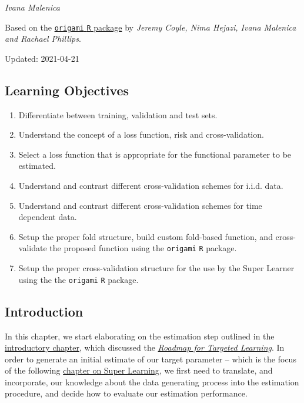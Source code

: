 \documentclass[12pt, krantz2,]{krantz}
\providecommand{\tightlist}{%
  \setlength{\itemsep}{0pt}\setlength{\parskip}{0pt}}
\theoremstyle{definition}
\theoremstyle{definition}
\theoremstyle{definition}
\newcommand{\1}{\mathbbm{1}}
\begin{document}
\emph{Ivana Malenica}

Based on the \href{https://github.com/tlverse/origami}{\texttt{origami} \texttt{R} package}
by \emph{Jeremy Coyle, Nima Hejazi, Ivana Malenica and Rachael Phillips}.

Updated: 2021-04-21

\hypertarget{learning-objectives-2}{%
\subsection{Learning Objectives}\label{learning-objectives-2}}

\begin{enumerate}
\def\labelenumi{\arabic{enumi}.}
\tightlist
\item
  Differentiate between training, validation and test sets.
\item
  Understand the concept of a loss function, risk and cross-validation.
\item
  Select a loss function that is appropriate for the functional parameter to be
  estimated.
\item
  Understand and contrast different cross-validation schemes for i.i.d. data.
\item
  Understand and contrast different cross-validation schemes for time dependent
  data.
\item
  Setup the proper fold structure, build custom fold-based function, and
  cross-validate the proposed function using the \texttt{origami} \texttt{R} package.
\item
  Setup the proper cross-validation structure for the use by the Super Learner
  using the the \texttt{origami} \texttt{R} package.
\end{enumerate}

\hypertarget{introduction-1}{%
\subsection{Introduction}\label{introduction-1}}

In this chapter, we start elaborating on the estimation step outlined in the
\protect\hyperlink{intro}{introductory chapter}, which discussed the \protect\hyperlink{roadmap}{\emph{Roadmap for Targeted
Learning}}. In order to generate an initial estimate of our target
parameter -- which is the focus of the following \protect\hyperlink{sl3}{chapter on Super
Learning}, we first need to translate, and incorporate, our knowledge
about the data generating process into the estimation procedure, and decide how
to evaluate our estimation performance.
\end{document}
